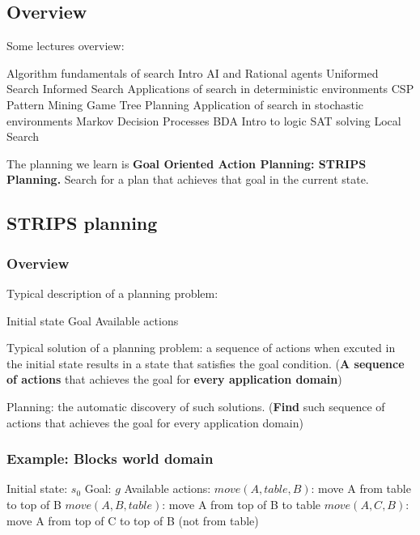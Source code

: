 \subsection{Overview}
Some lectures overview:
\begin{outline}
    \1 Algorithm fundamentals of search
        \2 Intro AI and Rational agents
        \2 Uniformed Search
        \2 Informed Search
    \1 Applications of search in deterministic environments
        \2 CSP
        \2 Pattern Mining
        \2 Game Tree
        \2 Planning
    \1 Application of search in stochastic environments
        \2 Markov Decision Processes
    \1 BDA
        \2 Intro to logic
        \2 SAT solving
        \2 Local Search
\end{outline}

\noindent
The planning we learn is \textbf{Goal Oriented Action Planning: STRIPS Planning.} Search for a plan that achieves that goal in the current state.

\subsection{STRIPS planning}
\subsubsection{Overview}
Typical description of a planning problem:
\begin{outline}
    \1 Initial state
    \1 Goal
    \1 Available actions
\end{outline}

\noindent
Typical solution of a planning problem: a sequence of actions when excuted in the initial state results in a state that satisfies the goal condition. (\textbf{A sequence of actions} that achieves the goal for \textbf{every application domain})

\noindent
Planning: the automatic discovery of such solutions. (\textbf{Find} such sequence of actions that achieves the goal for every application domain)

\subsubsection{Example: Blocks world domain}
\begin{outline}
    \1 Initial state: $s_{0}$
    \1 Goal: $g$
    \1 Available actions:
        \2 $move(A,table,B)$: move A from table to top of B
        \2 $move(A,B,table)$: move A from top of B to table
        \2 $move(A,C,B)$: move A from top of C to top of B (not from table)
\end{outline}

